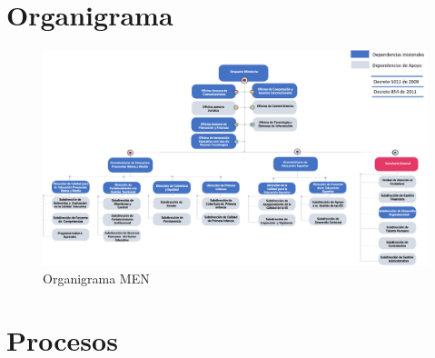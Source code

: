 \section{Organigrama}

\begin{figure}[h!]
	\centering
	\includegraphics[width=1.1\linewidth]{imgs/organigrama.jpeg}
	\caption{Organigrama MEN}
\end{figure}


\section{Procesos}

